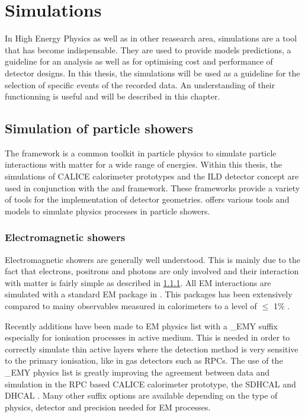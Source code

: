 \chapter{\geant Simulations}
\label{chap:G4Simulation}

In High Energy Physics as well as in other reasearch area, simulations are a tool that has become indispensable. They are used to provide models predictions, a guideline for an analysis as well as for optimising cost and performance of detector designs. In this thesis, the simulations will be used as a guideline for the selection of specific events of the recorded data. An understanding of their functionning is useful and will be described in this chapter.

\section{Simulation of particle showers}

The \geant framework \cite{Agostinelli2003} is a common toolkit in particle physics to simulate particle interactions with matter for a wide range of energies. Within this thesis, the simulations of CALICE calorimeter prototypes and the ILD detector concept are used in conjunction with the \mokka \cite{Freitas2003} and \ddhep \cite{Frank2014} framework. These frameworks provide a variety of tools for the implementation of detector geometries. \geant offers various tools and models to simulate physics processes in particle showers.

\subsection{Electromagnetic showers}

Electromagnetic showers are generally well understood. This is mainly due to the fact that electrons, positrons and photons are only involved and their interaction with matter is fairly simple as described in \ref{}. All EM interactions are simulated with a standard EM package in \geant \cite{Ivanchenko2010}. This packages has been extensively compared to mainy observables measured in calorimeters to a level of $\leq$ 1\% \cite{Apostolakis2015}.

Recently additions have been made to EM physics list with a \_{}EMY suffix especially for ionisation processes in active medium. This is needed in order to correctly simulate thin active layers where the detection method is very sensitive to the primary ionisation, like in gas detectors such as RPCs. The use of the \_{}EMY physics list is greatly improving the agreement between data and simulation in the RPC based CALICE calorimeter prototype, the SDHCAL and DHCAL \cite{Neubueser2016}. Many other suffix options are available depending on the type of physics, detector and precision needed for EM processes.

